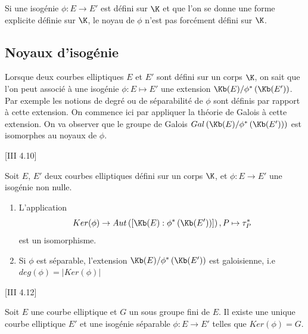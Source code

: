 \begin{Rem}
	Si une isogénie $\phi : E\rightarrow E'$ est défini sur $\K$ et que l'on se donne une forme explicite définie sur $\K$, le noyau de $\phi$ n'est pas forcément défini sur $\K$.
\end{Rem}











\subsection{Noyaux d'isogénie}


Lorsque deux courbes elliptiques $E$ et $E'$ sont défini sur un corps $\K$, on sait que l'on peut associé à une isogénie $\phi : E\mapsto E'$ une extension $\Kb(E)/\phi^{*}\left( \Kb(E')\right)$. Par exemple les notions de degré ou de séparabilité de $\phi$ sont définis par rapport à cette extension. On commence ici par appliquer la théorie de Galois à cette extension. On va observer que le groupe de Galois $Gal\left( \Kb(E)/\phi^{*}\left( \Kb(E')\right)\right)$ est isomorphes au noyaux de $\phi$.


\begin{The}\cite{Sil09}[III 4.10]
	
	Soit $E$, $E'$ deux courbes elliptiques défini sur un corps $\K$, et $\phi : E\rightarrow E'$ une isogénie non nulle. 
	\begin{enumerate}
		\item L'application 
		\begin{equation*}
			Ker(\phi) \rightarrow Aut\left( \left[ \Kb(E) : \phi^{*}\left( \Kb(E')\right) \right] \right) , P\mapsto \tau_{P}^{*}
		\end{equation*} 
		est un isomorphisme.
		\item Si $\phi$ est séparable, l'extension $\Kb(E)/\phi^{*}\left( \Kb(E')\right)$ est galoisienne, i.e $deg(\phi) = |Ker(\phi)|$
	\end{enumerate}
\end{The}

\begin{Coro}\cite{Sil09}[III 4.12]
	
	Soit $E$ une courbe elliptique et $G$ un sous groupe fini de $E$. Il existe une unique courbe elliptique $E'$ et une isogénie séparable $\phi : E \rightarrow E'$ telles que $Ker(\phi) = G$.
\end{Coro}

